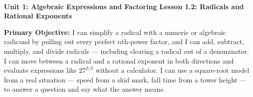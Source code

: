 \documentclass[10pt]{article}
\newcommand{\UnitNumberName}{Unit 1: Algebraic Expressions and Factoring \quad}
\newcommand{\LessonNumberName}{Lesson 1.2: Radicals and Rational Exponents}
\begin{document}
\begin{center}
    {\Large\bfseries \CourseName \\
    {\small\bfseries \UnitNumberName \LessonNumberName}}
\end{center}

\begin{tcolorbox}[colback=mist, colframe=royal, boxrule=0.9pt, arc=2mm,
    left=2mm, right=2mm, top=1.5mm, bottom=1.5mm]
    \textbf{Primary Objective:} I can simplify a radical with a numeric or algebraic radicand by
    pulling out every perfect $n$th-power factor, and I can add, subtract, multiply, and divide
    radicals --- including clearing a radical out of a denominator. I can move between a radical
    and a rational exponent in both directions and evaluate expressions like $27^{2/3}$ without a
    calculator. I can use a square-root model from a real situation --- speed from a skid mark,
    fall time from a tower height --- to answer a question and say what the answer means.
\end{tcolorbox}
\end{document}
